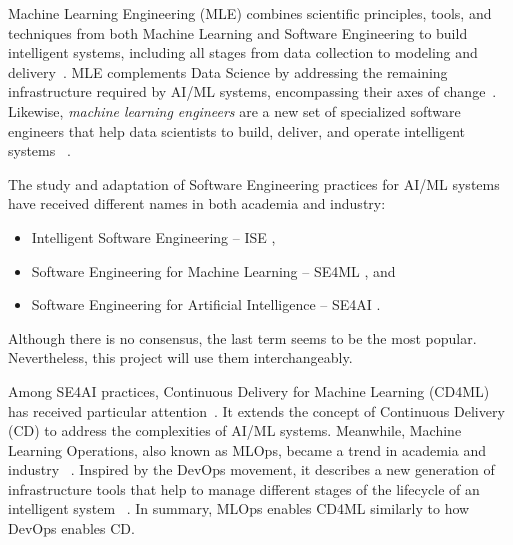 \clearpage

Machine Learning Engineering (MLE) combines scientific principles, tools,
and techniques from both Machine Learning and Software Engineering to build
intelligent systems, including all stages from data collection to modeling
and delivery~\parencite{Burkov2020MachineEngineering}. MLE complements
Data Science by addressing the remaining infrastructure required by AI/ML
systems, encompassing their axes of change~\parencite{Ozkaya2020WhatSystems,
Sato2019ContinuousLearning}. Likewise, \emph{machine learning engineers}
are a new set of specialized software engineers that help data scientists
to build, deliver, and operate intelligent systems%
~\mbox{\parencite{Burkov2020MachineEngineering,Lakshmanan2020MachinePatterns}}.

The study and adaptation of Software Engineering practices for AI/ML
systems have received different names in both academia and industry:
\begin{itemize}
  \item Intelligent Software Engineering -- ISE
        \parencite{Xie2018IntelligentEngineering},
  \item Software Engineering for Machine Learning -- SE4ML
        \parencite{Amershi2019SoftwareStudy,
                   Martinez-Fernandez2022SoftwareSurvey,
                   Sculley2015HiddenSystems}, and
  \item Software Engineering for Artificial Intelligence -- SE4AI 
        \parencite{Carleton2020TheSE,
                   Kastner2020TeachingSystems,
                   Martinez-Fernandez2022SoftwareSurvey,
                   Menzies2020TheAI}.
\end{itemize}
Although there is no consensus, the last term seems to be the most popular.
Nevertheless, this project will use them interchangeably.

Among SE4AI practices, Continuous Delivery for Machine Learning (CD4ML)
has received particular attention~\parencite{Sato2019ContinuousLearning}.
It extends the concept of Continuous Delivery (CD) to address the
complexities of AI/ML systems. Meanwhile, Machine Learning Operations,
also known as MLOps, became a trend in academia and industry%
~\parencite{Tamburri2020SustainableChallenges}. Inspired by the
DevOps movement, it describes a new generation of infrastructure tools
that help to manage different stages of the lifecycle of an intelligent system%
~\mbox{\parencite{Gift2021PracticalModels,Stenac2020IntroducingMLOps}}.
In summary, MLOps enables CD4ML similarly to how DevOps enables CD.